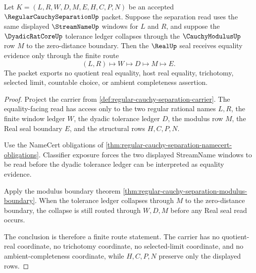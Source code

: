 \begin{theorem}
\label{thm:regular-cauchy-separation-zero-distance-reflection}
Let $K=(L,R,W,D,M,E,H,C,P,N)$ be an accepted $\RegularCauchySeparationUp$ packet. Suppose the separation read uses the same displayed $\StreamNameUp$ windows for $L$ and $R$, and suppose the $\DyadicRatCoreUp$ tolerance ledger collapses through the $\CauchyModulusUp$ row $M$ to the zero-distance boundary. Then the $\RealUp$ seal receives equality evidence only through the finite route
$$
(L,R)\longmapsto W\longmapsto D\longmapsto M\longmapsto E .
$$
The packet exports no quotient real equality, host real equality, trichotomy, selected limit, countable choice, or ambient completeness assertion.
\end{theorem}
\begin{proof}
Project the carrier from \autoref{def:regular-cauchy-separation-carrier}. The equality-facing read has access only to the two regular rational names $L,R$, the finite window ledger $W$, the dyadic tolerance ledger $D$, the modulus row $M$, the Real seal boundary $E$, and the structural rows $H,C,P,N$.

Use the NameCert obligations of \autoref{thm:regular-cauchy-separation-namecert-obligations}. Classifier exposure forces the two displayed StreamName windows to be read before the dyadic tolerance ledger can be interpreted as equality evidence.

Apply the modulus boundary theorem \autoref{thm:regular-cauchy-separation-modulus-boundary}. When the tolerance ledger collapses through $M$ to the zero-distance boundary, the collapse is still routed through $W,D,M$ before any Real seal read occurs.

The conclusion is therefore a finite route statement. The carrier has no quotient-real coordinate, no trichotomy coordinate, no selected-limit coordinate, and no ambient-completeness coordinate, while $H,C,P,N$ preserve only the displayed rows.
\end{proof}

